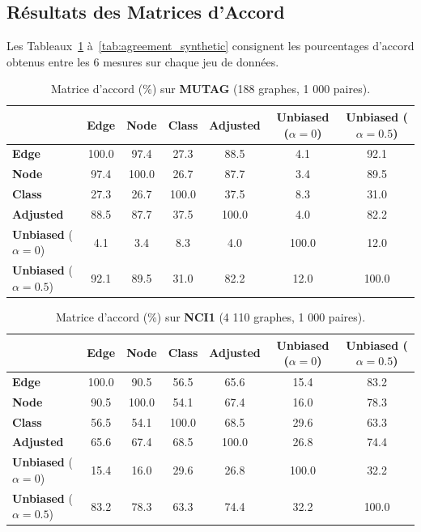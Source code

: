 \documentclass[11pt,a4paper]{article}
\begin{document}
\subsection{Résultats des Matrices d'Accord}

Les Tableaux~\ref{tab:agreement_mutag} à~\ref{tab:agreement_synthetic} consignent les pourcentages d'accord obtenus entre les 6 mesures sur chaque jeu de données.

\begin{table}[htbp]
\centering
\caption{Matrice d'accord (\%) sur \textbf{MUTAG} (188 graphes, 1 000 paires).}
\label{tab:agreement_mutag}
\small
\begin{tabular}{lcccccc}
\toprule
& \textbf{Edge} & \textbf{Node} & \textbf{Class} & \textbf{Adjusted} & \textbf{Unbiased} ($\alpha=0$) & \textbf{Unbiased} ($\alpha=0.5$) \\
\midrule
\textbf{Edge}                  & 100.0 & 97.4  & 27.3  & 88.5  & 4.1   & 92.1  \\
\textbf{Node}                  & 97.4  & 100.0 & 26.7  & 87.7  & 3.4   & 89.5  \\
\textbf{Class}                 & 27.3  & 26.7  & 100.0 & 37.5  & 8.3   & 31.0  \\
\textbf{Adjusted}              & 88.5  & 87.7  & 37.5  & 100.0 & 4.0   & 82.2  \\
\textbf{Unbiased} ($\alpha=0$)   & 4.1   & 3.4   & 8.3   & 4.0   & 100.0 & 12.0  \\
\textbf{Unbiased} ($\alpha=0.5$) & 92.1  & 89.5  & 31.0  & 82.2  & 12.0  & 100.0 \\
\bottomrule
\end{tabular}
\end{table}

\begin{table}[htbp]
\centering
\caption{Matrice d'accord (\%) sur \textbf{NCI1} (4 110 graphes, 1 000 paires).}
\label{tab:agreement_nci1}
\small
\begin{tabular}{lcccccc}
\toprule
& \textbf{Edge} & \textbf{Node} & \textbf{Class} & \textbf{Adjusted} & \textbf{Unbiased} ($\alpha=0$) & \textbf{Unbiased} ($\alpha=0.5$) \\
\midrule
\textbf{Edge}                  & 100.0 & 90.5  & 56.5  & 65.6  & 15.4  & 83.2  \\
\textbf{Node}                  & 90.5  & 100.0 & 54.1  & 67.4  & 16.0  & 78.3  \\
\textbf{Class}                 & 56.5  & 54.1  & 100.0 & 68.5  & 29.6  & 63.3  \\
\textbf{Adjusted}              & 65.6  & 67.4  & 68.5  & 100.0 & 26.8  & 74.4  \\
\textbf{Unbiased} ($\alpha=0$)   & 15.4  & 16.0  & 29.6  & 26.8  & 100.0 & 32.2  \\
\textbf{Unbiased} ($\alpha=0.5$) & 83.2  & 78.3  & 63.3  & 74.4  & 32.2  & 100.0 \\
\bottomrule
\end{tabular}
\end{table}
\end{document}
